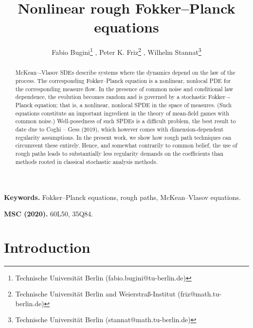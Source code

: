 \documentclass[10pt, a4paper]{article} %
\title{Nonlinear rough Fokker--Planck equations}
\author{Fabio Bugini\thanks{Technische Universit\"at Berlin (fabio.bugini@tu-berlin.de)} , Peter K. Friz\thanks{Technische Universit\"at Berlin and Weierstraß-Institut (friz@math.tu-berlin.de)} , Wilhelm Stannat\thanks{Technische Universit\"at Berlin (stannat@math.tu-berlin.de)}}
\theoremstyle{definition}
\theoremstyle{plain}
\begin{document}
\maketitle

\begin{abstract}
McKean–-Vlasov SDEs describe systems where the dynamics depend on the law of the process. The corresponding Fokker--Planck equation is a nonlinear, nonlocal PDE for the corresponding measure flow. In the presence of common noise and conditional law dependence, the evolution becomes random and is governed by a stochastic Fokker–-Planck equation; that is, a nonlinear, nonlocal SPDE in the space of measures. (Such equations constitute an important ingredient in the theory of mean-field games with common noise.) Well-posedness of such SPDEs is a difficult problem, the best result to date due to Coghi -- Gess (2019), which however comes with dimension-dependent regularity assumptions. In the present work, we show how rough path techniques can circumvent these entirely. Hence, and somewhat contrarily to common belief, the use of rough paths leads to substantially less regularity demands on the coefficients than methods rooted in classical stochastic analysis methods. 
\end{abstract}

\smallskip
\noindent \textbf{Keywords.} Fokker--Planck equations, rough paths, McKean--Vlasov equations. 

\smallskip
\noindent \textbf{MSC (2020).} 60L50, %
35Q84. %


\tableofcontents

\section{Introduction}
\end{document}
